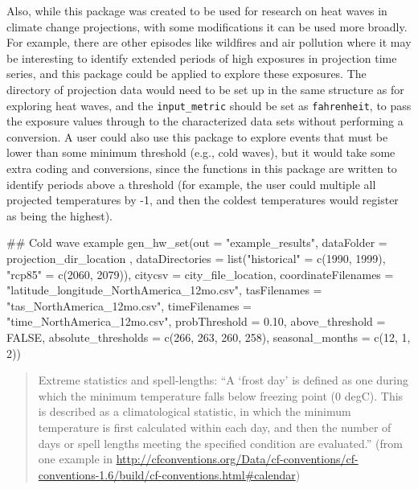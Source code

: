 Also, while this package was created to be used for research on heat
waves in climate change projections, with some modifications it can be
used more broadly. For example, there are other episodes like wildfires
and air pollution where it may be interesting to identify extended
periods of high exposures in projection time series, and this package
could be applied to explore these exposures. The directory of projection
data would need to be set up in the same structure as for exploring heat
waves, and the \texttt{input\_metric} should be set as
\texttt{fahrenheit}, to pass the exposure values through to the
characterized data sets without performing a conversion. A user could
also use this package to explore events that must be lower than some
minimum threshold (e.g., cold waves), but it would take some extra
coding and conversions, since the functions in this package are written
to identify periods above a threshold (for example, the user could
multiple all projected temperatures by -1, and then the coldest
temperatures would register as being the highest).

\begin{Schunk}
\begin{Sinput}
## Cold wave example
gen_hw_set(out = "example_results",
           dataFolder = projection_dir_location ,
           dataDirectories = list("historical" = c(1990, 1999),
                                  "rcp85" = c(2060, 2079)),
           citycsv = city_file_location,
           coordinateFilenames = "latitude_longitude_NorthAmerica_12mo.csv",
           tasFilenames = "tas_NorthAmerica_12mo.csv",
           timeFilenames = "time_NorthAmerica_12mo.csv", 
           probThreshold = 0.10, 
           above_threshold = FALSE, 
           absolute_thresholds = c(266, 263, 260, 258), 
           seasonal_months = c(12, 1, 2))
\end{Sinput}
\end{Schunk}

\begin{quote}
Extreme statistics and spell-lengths: ``A `frost day' is defined as one
during which the minimum temperature falls below freezing point (0
degC). This is described as a climatological statistic, in which the
minimum temperature is first calculated within each day, and then the
number of days or spell lengths meeting the specified condition are
evaluated.'' (from one example in
\url{http://cfconventions.org/Data/cf-conventions/cf-conventions-1.6/build/cf-conventions.html\#calendar})
\end{quote}

